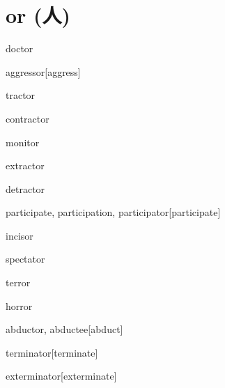 \section{or (人)}


\begin{RefWord}{doctor}
\end{RefWord}

\begin{RefWord}{aggressor}[aggress]
\end{RefWord}

\begin{RefWord}{tractor}
\end{RefWord}

\begin{RefWord}{contractor}
\end{RefWord}

\begin{RefWord}{monitor}
\end{RefWord}

\begin{RefWord}{extractor}
\end{RefWord}

\begin{RefWord}{detractor}
\end{RefWord}

\begin{RefWord}{participate, participation, participator}[participate]
\end{RefWord}

\begin{RefWord}{incisor}
\end{RefWord}

\begin{RefWord}{spectator}
\end{RefWord}

\begin{RefWord}{terror}
\end{RefWord}

\begin{RefWord}{horror}
\end{RefWord}

\begin{RefWord}{abductor, abductee}[abduct]
\end{RefWord}

\begin{RefWord}{terminator}[terminate]
\end{RefWord}

\begin{RefWord}{exterminator}[exterminate]
\end{RefWord}

